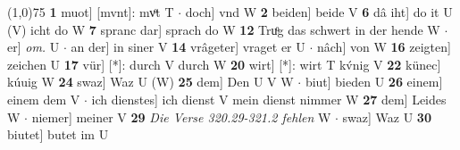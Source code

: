 \documentclass[8pt,a4paper,notitlepage]{article}
\begin{document}
\begin{table}[ht]
\begin{minipage}[t]{0.5\linewidth}
\line(1,0){75} \newline
\textbf{1} muot] [mvnt]: mvͦt T  $\cdot$ doch] vnd W \textbf{2} beiden] beide V \textbf{6} dâ iht] do it U (V) icht do W \textbf{7} spranc dar] sprach do W \textbf{12} Truͦg das schwert in der hende W  $\cdot$ er] \textit{om.} U  $\cdot$ an der] in siner V \textbf{14} vrâgeter] vraget er U  $\cdot$ nâch] von W \textbf{16} zeigten] zeichen U \textbf{17} vür] [*]: durch V durch W \textbf{20} wirt] [*]: wirt T kv́nig V \textbf{22} künec] kúuig W \textbf{24} swaz] Waz U (W) \textbf{25} dem] Den U V W  $\cdot$ biut] bieden U \textbf{26} einem] einem dem V  $\cdot$ ich dienstes] ich dienst V mein dienst nimmer W \textbf{27} dem] Leides W  $\cdot$ niemer] meiner V \textbf{29} \textit{Die Verse 320.29-321.2 fehlen} W   $\cdot$ swaz] Waz U \textbf{30} biutet] butet im U \newline
\end{minipage}
\end{table}
\end{document}
